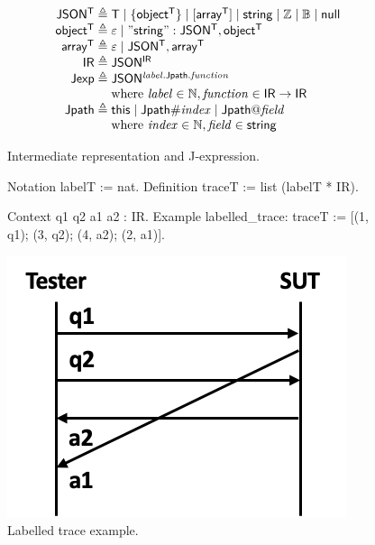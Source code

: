 \begin{figure}
\[\begin{array}{r@{\;}l}
\mathsf{JSON^T}\triangleq&\mathsf T\mid\{\mathsf{object^T}\}\mid[\mathsf{array^T}]\mid\mathsf{string}\mid\Int\mid\Bool\mid\mathsf{null}\\
\mathsf{object^T}\triangleq&\nil\mid\mathsf{"string": JSON^T,object^T}\\
\mathsf{array^T}\triangleq&\nil\mid\mathsf{JSON^T,array^T}\\
\mathsf{IR}\triangleq&\mathsf{JSON^{IR}}\\
\mathsf{Jexp}\triangleq&\mathsf{JSON^{\Jref{\Label}{\Jpath}{\Function}}}\\
&\text{where }\Label\in\Nat,\Function\in\mathsf{IR}\to\mathsf{IR}\\
\Jpath\triangleq&\This\mid\Jpath\Number\Index\mid\Jpath\At\Field\\
&\text{where }\Index\in\Nat,\Field\in\mathsf{string}
\end{array}\]
\caption{Intermediate representation and J-expression.}
\label{fig:ir-jexp}
\end{figure}

\begin{figure}
\begin{minipage}{.6\textwidth}
\begin{coq}
Notation   labelT := nat.
Definition traceT := list (labelT * IR).

Context q1 q2 a1 a2 : IR.
Example labelled_trace: traceT :=
  [(1, q1); (3, q2); (4, a2); (2, a1)].
\end{coq}
\end{minipage}\begin{minipage}{.3\textwidth}
  \includegraphics[width=\linewidth]{figures/ir-trace}
\end{minipage}
\caption{Labelled trace example.}
\label{fig:ir-trace}
\end{figure}

